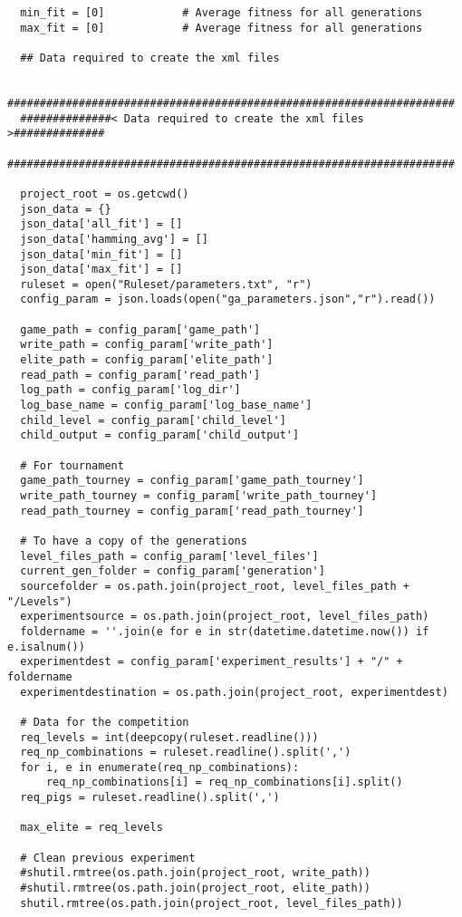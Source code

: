 \begin{verbatim}
  min_fit = [0]            # Average fitness for all generations
  max_fit = [0]            # Average fitness for all generations

  ## Data required to create the xml files

  #####################################################################
  ##############< Data required to create the xml files >##############
  #####################################################################

  project_root = os.getcwd()
  json_data = {}
  json_data['all_fit'] = []
  json_data['hamming_avg'] = []
  json_data['min_fit'] = []
  json_data['max_fit'] = []
  ruleset = open("Ruleset/parameters.txt", "r")
  config_param = json.loads(open("ga_parameters.json","r").read())

  game_path = config_param['game_path']
  write_path = config_param['write_path']
  elite_path = config_param['elite_path']
  read_path = config_param['read_path']
  log_path = config_param['log_dir']
  log_base_name = config_param['log_base_name']
  child_level = config_param['child_level']
  child_output = config_param['child_output']

  # For tournament
  game_path_tourney = config_param['game_path_tourney']
  write_path_tourney = config_param['write_path_tourney']
  read_path_tourney = config_param['read_path_tourney']

  # To have a copy of the generations
  level_files_path = config_param['level_files']
  current_gen_folder = config_param['generation']
  sourcefolder = os.path.join(project_root, level_files_path + "/Levels")
  experimentsource = os.path.join(project_root, level_files_path)
  foldername = ''.join(e for e in str(datetime.datetime.now()) if e.isalnum())
  experimentdest = config_param['experiment_results'] + "/" + foldername
  experimentdestination = os.path.join(project_root, experimentdest)

  # Data for the competition
  req_levels = int(deepcopy(ruleset.readline()))
  req_np_combinations = ruleset.readline().split(',')
  for i, e in enumerate(req_np_combinations):
      req_np_combinations[i] = req_np_combinations[i].split()
  req_pigs = ruleset.readline().split(',')

  max_elite = req_levels

  # Clean previous experiment
  #shutil.rmtree(os.path.join(project_root, write_path))
  #shutil.rmtree(os.path.join(project_root, elite_path))
  shutil.rmtree(os.path.join(project_root, level_files_path))


\end{verbatim}
